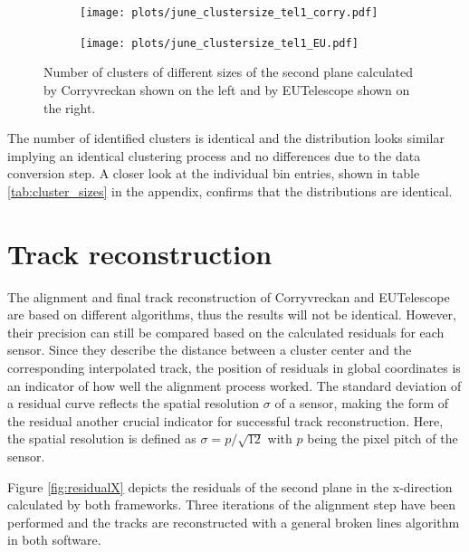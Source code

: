 \begin{figure}
  \hspace{-2.5cm}
  \begin{subfigure}{0.62\textwidth}
      \texttt{[image: plots/june\_clustersize\_tel1\_corry.pdf]}
  \end{subfigure}
  \begin{subfigure}{0.62\textwidth}
      \texttt{[image: plots/june\_clustersize\_tel1\_EU.pdf]}
  \end{subfigure}
  \caption{Number of clusters of different sizes of the second plane calculated by Corryvreckan shown on the left and by EUTelescope shown on the right.}
  \label{fig:cluster_size}
\end{figure}

The number of identified clusters is identical and the distribution looks similar implying an identical clustering process
and no differences due to the data conversion step. A closer look at the individual bin entries, shown in table \ref{tab:cluster_sizes} in the appendix,
confirms that the distributions are identical.

\section{Track reconstruction}
The alignment and final track reconstruction of Corryvreckan and EUTelescope are based on different algorithms, thus the
results will not be identical. However, their precision can still be compared based on the calculated residuals for each sensor.
Since they describe the distance between a cluster center and the corresponding interpolated track, the position of
residuals in global coordinates is an indicator of how well the alignment process worked. The standard deviation of a
residual curve reflects the spatial resolution $\sigma$ of a sensor, making the form of the residual another crucial indicator
for successful track reconstruction. Here, the spatial resolution is defined as ${\sigma = p/\sqrt{12}}$ with $p$ being the
pixel pitch of the sensor.

Figure \ref{fig:residualX} depicts the residuals of the second plane in the x-direction calculated by both frameworks. Three iterations
of the alignment step have been performed and the tracks are reconstructed with a general broken lines algorithm in both software.

